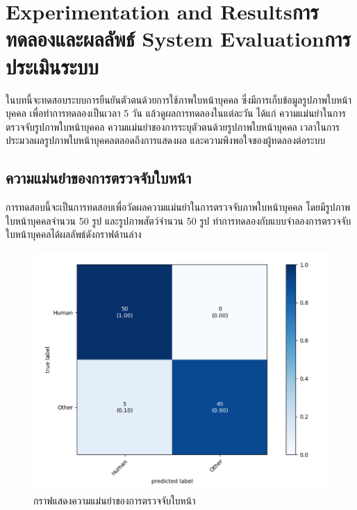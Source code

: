 \chapter{\ifproject%
\ifenglish Experimentation and Results\else การทดลองและผลลัพธ์\fi
\else%
\ifenglish System Evaluation\else การประเมินระบบ\fi
\fi}

ในบทนี้จะทดสอบระบบการยืนยันตัวตนด้วยการใช้ภาพใบหน้าบุคคล ซึ่งมีการเก็บข้อมูลรูปภาพใบหน้าบุคคล เพื่อทำการทดลองเป็นเวลา 5 วัน แล้วดูผลการทดลองในแต่ละวัน ได้แก่ 
ความแม่นยำในการตรวจจับรูปภาพใบหน้าบุคคล ความแม่นยำของการระบุตัวตนด้วยรูปภาพใบหน้าบุคคล เวลาในการประมวลผลรูปภาพใบหน้าบุคคลตลอดถึงการแสดงผล 
และความพึงพอใจของผู้ทดลองต่อระบบ


\section{ความแม่นยำของการตรวจจับใบหน้า}
การทดสอบนี้จะเป็นการทดสอบเพื่อวัดผลความแม่นยำในการตรวจจับภาพใบหน้าบุคคล โดยมีรูปภาพใบหน้าบุคคลจำนวน 50 รูป และรูปภาพสัตว์จำนวน 50 รูป 
ทำการทดลองกับแบบจำลองการตรวจจับใบหน้าบุคคลได้ผลลัพธ์ดังกราฟด้านล่าง

\begin{figure}[!ht]
  \begin{center}
    \includegraphics[scale=.45]{pic/face_result.png}
    \caption[กราฟแสดงความแม่นยำของการตรวจจับใบหน้า]{กราฟแสดงความแม่นยำของการตรวจจับใบหน้า}
    \label{fig:acc_graph}
  \end{center}
\end{figure}

